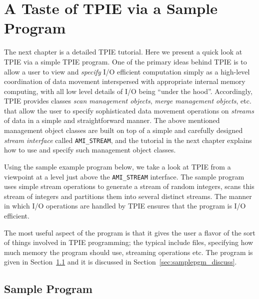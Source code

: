\chapter{A Taste of TPIE via a Sample Program}
\label{ch:samplepgmr}

The next chapter is a detailed TPIE tutorial. Here we present a quick look
at TPIE via a simple TPIE program. One of the primary ideas behind TPIE is
to allow a user to view and \emph{specify} I/O efficient computation simply
as a high-level coordination of data movement interspersed with
appropriate internal memory computing, with all low level details of I/O
being ``under the hood''. Accordingly, TPIE provides classes \emph{scan
management objects}, \emph{merge management objects}, etc. that allow the
user to specify sophisticated data movement operations on \emph{streams} of
data in a simple and straightforward manner. The above mentioned
management object classes are built on top of a simple and carefully
designed \emph{stream interface} called \verb|AMI_STREAM|, and the tutorial
in the next chapter explains how to use and specify such management object
classes.

Using the sample example program below, we take a look at TPIE from a
viewpoint at a level just above the \verb|AMI_STREAM| interface.  The
sample program uses simple stream operations to generate a stream of random
integers, scans this stream of integers and partitions them into several
distinct streams. The manner in which I/O operations are handled by TPIE
ensures that the program is I/O efficient.


The most useful aspect of the program is that it gives the user a 
flavor of the sort of things involved in TPIE programming; the typical 
include files, specifying how much memory the program should use, 
streaming operations etc. The program is given in
Section~\ref{sec:samplepgm} and it is discussed in
Section~\ref{sec:samplepgm_discuss}.


\section{Sample Program}\label{sec:samplepgm}

